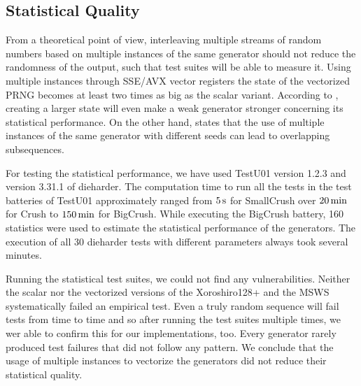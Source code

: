 \documentclass{stdlocal}
\begin{document}
  \subsection{Statistical Quality} %
  \label{sub:statistical_quality}
    From a theoretical point of view, interleaving multiple streams of random numbers based on multiple instances of the same generator should not reduce the randomness of the output, such that test suites will be able to measure it.
    Using multiple instances through SSE/AVX vector registers the state of the vectorized PRNG becomes at least two times as big as the scalar variant.
    According to \textcite{oneill-blog-toobig}, creating a larger state will even make a weak generator stronger concerning its statistical performance.
    On the other hand, \textcite{fog2015} states that the use of multiple instances of the same generator with different seeds can lead to overlapping subsequences.

    For testing the statistical performance, we have used TestU01 version 1.2.3 and version 3.31.1 of dieharder.
    The computation time to run all the tests in the test batteries of TestU01 approximately ranged from $5\, \mathrm{s}$ for SmallCrush over $20\, \mathrm{min}$ for Crush to $150\, \mathrm{min}$ for BigCrush.
    While executing the BigCrush battery, 160 statistics were used to estimate the statistical performance of the generators.
    The execution of all 30 dieharder tests with different parameters always took several minutes.

    Running the statistical test suites, we could not find any vulnerabilities.
    Neither the scalar nor the vectorized versions of the Xoroshiro128+ and the MSWS systematically failed an empirical test.
    Even a truly random sequence will fail tests from time to time \autocite[\pno~142]{kneusel2018} and so after running the test suites multiple times, we wer able to confirm this for our implementations, too.
    Every generator rarely produced test failures that did not follow any pattern.
    We conclude that the usage of multiple instances to vectorize the generators did not reduce their statistical quality.
\end{document}
